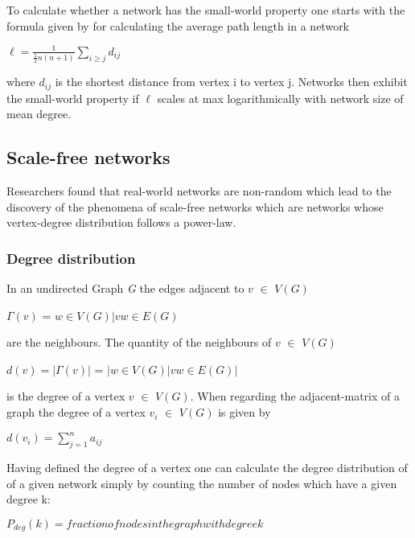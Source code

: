 \documentclass[../Bachelorarbeit.tex]{subfiles}
\begin{document}
\medskip

To calculate whether a network has the small-world property one starts with the formula given by \cite{Newman_ComplexNetworks} for calculating the average path length in a network

\begin{center}
$\ell = \frac{1}{\frac{1}{2}n(n+1)} \displaystyle\sum_{i \geq j }^{} d_{ij}$
\end{center}

where $d_{ij}$ is the shortest distance from vertex i to vertex j. Networks then exhibit the small-world property if $\ell$ scales at max logarithmically with network size of mean degree.

\subsection{Scale-free networks}
Researchers found that real-world networks are non-random which lead to the discovery of the phenomena of scale-free networks which are networks whose vertex-degree distribution follows a power-law.

\subsubsection{Degree distribution}
In an undirected Graph \textit{G} the edges adjacent to $v$ $\in$ $V(G)$ 

\begin{center}
$\Gamma(v)$ = ${w \in V(G) | vw \in E(G)}$
\end{center}

are the neighbours. The quantity of the neighbours of $v$ $\in$ $V(G)$ 

\begin{center}
$d(v) = |\Gamma(v)|$ = $|{w \in V(G) | vw \in E(G)}|$
\end{center}

is the degree of a vertex $v$ $\in$ $V(G)$. When regarding the adjacent-matrix of a graph the degree of a vertex $v_i$ $\in$ $V(G)$ is given by

\begin{center}
$d(v_i) = \displaystyle\sum_{j=1}^{n} a_{ij}$
\end{center}

Having defined the degree of a vertex one can calculate the degree distribution of of a given network simply by counting the number of nodes which have a given degree k:

\begin{center}
$P_{deg}(k) = fraction of nodes in the graph with degree k$
\end{center}
\end{document}
